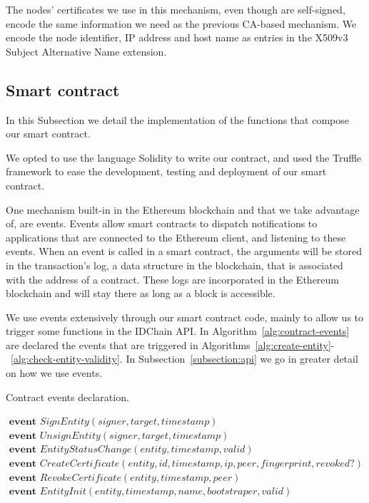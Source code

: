 The nodes' certificates we use in this mechanism, even though are self-signed, encode the same information we need as the previous CA-based mechanism.
We encode the node identifier, IP address and host name as entries in the X509v3 Subject Alternative Name extension.

\subsection{Smart contract}\label{subsection:smart-contract}

In this Subsection we detail the implementation of the functions that compose our smart contract.

We opted to use the language Solidity to write our contract, and used the Truffle framework to ease the development, testing and deployment of our smart contract.

One mechanism built-in in the Ethereum blockchain and that we take advantage of, are events.
Events allow smart contracts to dispatch notifications to applications that are connected to the Ethereum client, and listening to these events.
When an event is called in a smart contract, the arguments will be stored in the transaction's log, a data structure in the blockchain, that is associated with the address of a contract.
These logs are incorporated in the Ethereum blockchain and will stay there as long as a block is accessible.

We use events extensively through our smart contract code, mainly to allow us to trigger some functions in the IDChain API.
In Algorithm~\ref{alg:contract-events} are declared the events that are triggered in Algorithms~\ref{alg:create-entity}-~\ref{alg:check-entity-validity}.
In Subsection~\ref{subsection:api} we go in greater detail on how we use events.

\begin{algorithm}
  \caption{Contract events declaration.}
  \label{alg:contract-events}
  \begin{algorithmic}
    \State $\textbf{ event } SignEntity(signer, target, timestamp)$
    \State $\textbf{ event } UnsignEntity(signer, target, timestamp)$
    \State $\textbf{ event } EntityStatusChange(entity, timestamp, valid)$
    \State $\textbf{ event } CreateCertificate(entity, id, timestamp, ip, peer, fingerprint, revoked?)$
    \State $\textbf{ event } RevokeCertificate(entity, timestamp, peer)$
    \State $\textbf{ event } EntityInit(entity, timestamp, name, bootstraper, valid)$
  \end{algorithmic}
\end{algorithm}


